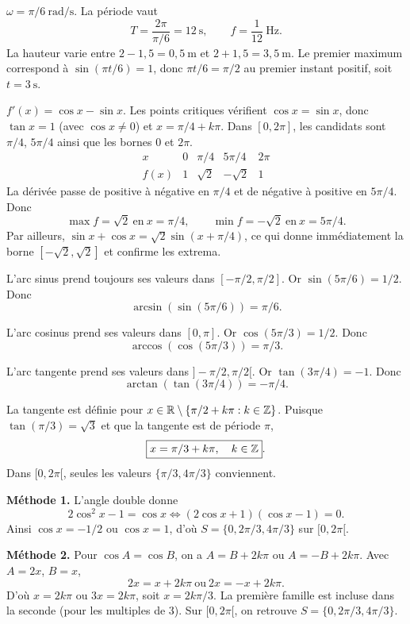 \(\omega=\pi/6\ \mathrm{rad/s}\). La période vaut
\[\boxed{T=\frac{2\pi}{\pi/6}=12\ \mathrm s},\qquad
\boxed{f=\frac1{12}\ \mathrm{Hz}}.\]
La hauteur varie entre \(2-1{,}5=\boxed{0{,}5\ \mathrm m}\) et \(2+1{,}5=\boxed{3{,}5\ \mathrm m}\). Le premier maximum correspond à \(\sin(\pi t/6)=1\), donc \(\pi t/6=\pi/2\) au premier instant positif, soit \(\boxed{t=3\ \mathrm s}\).

\(f'(x)=\cos x-\sin x\). Les points critiques vérifient \(\cos x=\sin x\), donc \(\tan x=1\) (avec \(\cos x\neq0\)) et \(x=\pi/4+k\pi\). Dans \([0,2\pi]\), les candidats sont \(\pi/4\), \(5\pi/4\) ainsi que les bornes \(0\) et \(2\pi\).
\[
\begin{array}{c|cccc}
x & 0 & \pi/4 & 5\pi/4 & 2\pi\\\hline
f(x)&1&\sqrt2&-\sqrt2&1
\end{array}
\]
La dérivée passe de positive à négative en \(\pi/4\) et de négative à positive en \(5\pi/4\). Donc
\[\boxed{\max f=\sqrt2\ \text{en}\ x=\pi/4},\qquad
\boxed{\min f=-\sqrt2\ \text{en}\ x=5\pi/4}.\]
Par ailleurs, \(\sin x+\cos x=\sqrt2\sin(x+\pi/4)\), ce qui donne immédiatement la borne \([-\sqrt2,\sqrt2]\) et confirme les extrema.

L'arc sinus prend toujours ses valeurs dans \([-\pi/2,\pi/2]\). Or \(\sin(5\pi/6)=1/2\). Donc\[\boxed{\arcsin(\sin(5\pi/6))=\pi/6}.\]

L'arc cosinus prend ses valeurs dans \([0,\pi]\). Or \(\cos(5\pi/3)=1/2\). Donc\[\boxed{\arccos(\cos(5\pi/3))=\pi/3}.\]

L'arc tangente prend ses valeurs dans \(]-\pi/2,\pi/2[\). Or \(\tan(3\pi/4)=-1\). Donc\[\boxed{\arctan(\tan(3\pi/4))=-\pi/4}.\]

La tangente est définie pour \(x\in\mathbb{R}\setminus\{\pi/2+k\pi:k\in\mathbb{Z}\}\). Puisque \(\tan(\pi/3)=\sqrt3\) et que la tangente est de période \(\pi\),
\[\boxed{x=\pi/3+k\pi,\quad k\in\mathbb{Z}}.\]
Dans \([0,2\pi[\), seules les valeurs \(\boxed{\{\pi/3,4\pi/3\}}\) conviennent.

\textbf{Méthode 1.} L'angle double donne
\[2\cos^2x-1=\cos x\iff(2\cos x+1)(\cos x-1)=0.\]
Ainsi \(\cos x=-1/2\) ou \(\cos x=1\), d'où \(\boxed{S=\{0,2\pi/3,4\pi/3\}}\) sur \([0,2\pi[\).

\textbf{Méthode 2.} Pour \(\cos A=\cos B\), on a \(A=B+2k\pi\) ou \(A=-B+2k\pi\). Avec \(A=2x\), \(B=x\),
\[2x=x+2k\pi\ \text{ou}\ 2x=-x+2k\pi.\]
D'où \(x=2k\pi\) ou \(3x=2k\pi\), soit \(x=2k\pi/3\). La première famille est incluse dans la seconde (pour les multiples de \(3\)). Sur \([0,2\pi[\), on retrouve \(\boxed{S=\{0,2\pi/3,4\pi/3\}}\).
